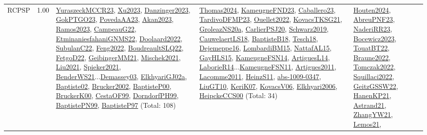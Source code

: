 {\begin{longtable}{p{3cm}r>{\raggedright\arraybackslash}p{6cm}>{\raggedright\arraybackslash}p{6cm}>{\raggedright\arraybackslash}p{8cm}}
\index{RCPSP}\index{Classification!RCPSP}RCPSP &  1.00 & \hyperref[detail:YuraszeckMCCR23]{YuraszeckMCCR23}, \hyperref[detail:Xu2023]{Xu2023}, \hyperref[detail:Danzinger2023]{Danzinger2023}, \hyperref[detail:GokPTGO23]{GokPTGO23}, \hyperref[detail:PovedaAA23]{PovedaAA23}, \hyperref[detail:Akan2023]{Akan2023}, \hyperref[detail:Ramos2023]{Ramos2023}, \hyperref[detail:CampeauG22]{CampeauG22}, \hyperref[detail:EtminaniesfahaniGNMS22]{EtminaniesfahaniGNMS22}, \hyperref[detail:Doolaard2022]{Doolaard2022}, \hyperref[detail:SubulanC22]{SubulanC22}, \hyperref[detail:Feng2022]{Feng2022}, \hyperref[detail:BoudreaultSLQ22]{BoudreaultSLQ22}, \hyperref[detail:FetgoD22]{FetgoD22}, \hyperref[detail:GeibingerMM21]{GeibingerMM21}, \hyperref[detail:Mischek2021]{Mischek2021}, \hyperref[detail:Liu2021]{Liu2021}, \hyperref[detail:Spieker2021]{Spieker2021}, \hyperref[detail:BenderWS21]{BenderWS21}...\hyperref[detail:Demassey03]{Demassey03}, \hyperref[detail:ElkhyariGJ02a]{ElkhyariGJ02a}, \hyperref[detail:Baptiste02]{Baptiste02}, \hyperref[detail:Brucker2002]{Brucker2002}, \hyperref[detail:BaptisteP00]{BaptisteP00}, \hyperref[detail:BruckerK00]{BruckerK00}, \hyperref[detail:CestaOF99]{CestaOF99}, \hyperref[detail:DorndorfPH99]{DorndorfPH99}, \hyperref[detail:BaptistePN99]{BaptistePN99}, \hyperref[detail:BaptisteP97]{BaptisteP97} (Total: 108) & \hyperref[detail:Thomas2024]{Thomas2024}, \hyperref[detail:KameugneFND23]{KameugneFND23}, \hyperref[detail:Caballero23]{Caballero23}, \hyperref[detail:TardivoDFMP23]{TardivoDFMP23}, \hyperref[detail:Ouellet2022]{Ouellet2022}, \hyperref[detail:KovacsTKSG21]{KovacsTKSG21}, \hyperref[detail:GroleazNS20a]{GroleazNS20a}, \hyperref[detail:CarlierPSJ20]{CarlierPSJ20}, \hyperref[detail:Schwarz2019]{Schwarz2019}, \hyperref[detail:CauwelaertLS18]{CauwelaertLS18}, \hyperref[detail:BaptisteB18]{BaptisteB18}, \hyperref[detail:Tesch18]{Tesch18}, \hyperref[detail:Dejemeppe16]{Dejemeppe16}, \hyperref[detail:LombardiBM15]{LombardiBM15}, \hyperref[detail:NattafAL15]{NattafAL15}, \hyperref[detail:GayHLS15]{GayHLS15}, \hyperref[detail:KameugneFSN14]{KameugneFSN14}, \hyperref[detail:ArtiguesL14]{ArtiguesL14}, \hyperref[detail:LaborieR14]{LaborieR14}...\hyperref[detail:KameugneFSN11]{KameugneFSN11}, \hyperref[detail:Artigues2011]{Artigues2011}, \hyperref[detail:Lacomme2011]{Lacomme2011}, \hyperref[detail:HeinzS11]{HeinzS11}, \hyperref[detail:abs-1009-0347]{abs-1009-0347}, \hyperref[detail:LiuGT10]{LiuGT10}, \hyperref[detail:KeriK07]{KeriK07}, \hyperref[detail:KovacsV06]{KovacsV06}, \hyperref[detail:Elkhyari2006]{Elkhyari2006}, \hyperref[detail:HeipckeCCS00]{HeipckeCCS00} (Total: 34) & \hyperref[detail:Houten2024]{Houten2024}, \hyperref[detail:AbreuPNF23]{AbreuPNF23}, \hyperref[detail:NaderiRR23]{NaderiRR23}, \hyperref[detail:Bocewicz2023]{Bocewicz2023}, \hyperref[detail:TouatBT22]{TouatBT22}, \hyperref[detail:Braune2022]{Braune2022}, \hyperref[detail:Tomczak2022]{Tomczak2022}, \hyperref[detail:Squillaci2022]{Squillaci2022}, \hyperref[detail:GeitzGSSW22]{GeitzGSSW22}, \hyperref[detail:HanenKP21]{HanenKP21}, \hyperref[detail:Astrand21]{Astrand21}, \hyperref[detail:ZhangYW21]{ZhangYW21}, \hyperref[detail:Lemos21]{Lemos21}, 
\end{longtable}}
